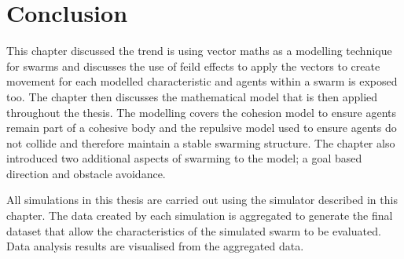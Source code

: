 \section{Conclusion}
This chapter discussed the trend is using vector maths as a modelling technique for swarms and discusses the use of feild effects to apply the vectors to create movement for each modelled characteristic and agents within a swarm is exposed too. The chapter then discusses the mathematical model that is then applied throughout the thesis. The modelling covers the cohesion model to ensure agents remain part of a cohesive body and the repulsive model used to ensure agents do not collide and therefore maintain a stable swarming structure. The chapter also introduced two additional aspects of swarming to the model; a goal based direction and obstacle avoidance. 

All simulations in this thesis are carried out using the simulator described in this chapter. The data created by each simulation is aggregated to generate the final dataset that allow the characteristics of the simulated swarm to be evaluated. Data analysis results are visualised from the aggregated data. 

